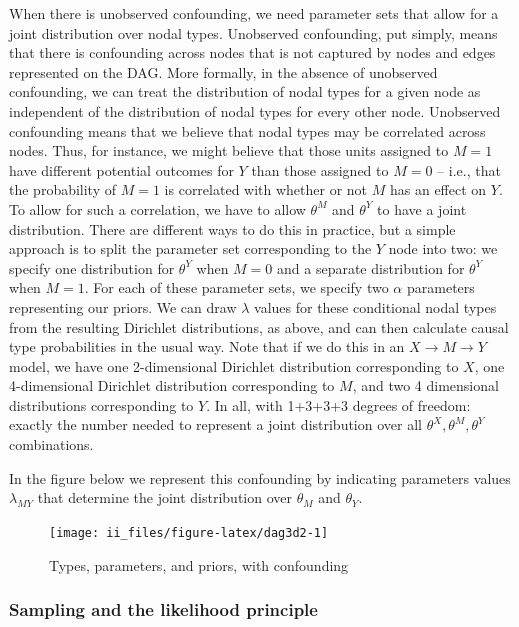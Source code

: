 \documentclass[
  12pt,
]{book}
\begin{document}
When there is unobserved confounding, we need parameter sets that allow for a joint distribution over nodal types. Unobserved confounding, put simply, means that there is confounding across nodes that is not captured by nodes and edges represented on the DAG. More formally, in the absence of unobserved confounding, we can treat the distribution of nodal types for a given node as independent of the distribution of nodal types for every other node. Unobserved confounding means that we believe that nodal types may be correlated across nodes. Thus, for instance, we might believe that those units assigned to \(M=1\) have different potential outcomes for \(Y\) than those assigned to \(M=0\) -- i.e., that the probability of \(M=1\) is correlated with whether or not \(M\) has an effect on \(Y\). To allow for such a correlation, we have to allow \(\theta^M\) and \(\theta^Y\) to have a joint distribution. There are different ways to do this in practice, but a simple approach is to split the parameter set corresponding to the \(Y\) node into two: we specify one distribution for \(\theta^Y\) when \(M=0\) and a separate distribution for \(\theta^Y\) when \(M=1\). For each of these parameter sets, we specify two \(\alpha\) parameters representing our priors. We can draw \(\lambda\) values for these conditional nodal types from the resulting Dirichlet distributions, as above, and can then calculate causal type probabilities in the usual way. Note that if we do this in an \(X \rightarrow M \rightarrow Y\) model, we have one 2-dimensional Dirichlet distribution corresponding to \(X\), one 4-dimensional Dirichlet distribution corresponding to \(M\), and two 4 dimensional distributions corresponding to \(Y\). In all, with 1+3+3+3 degrees of freedom: exactly the number needed to represent a joint distribution over all \(\theta^X, \theta^M, \theta^Y\) combinations.

In the figure below we represent this confounding by indicating parameters values \(\lambda_{MY}\) that determine the joint distribution over \(\theta_M\) and \(\theta_Y\).

\begin{figure}

{\centering \texttt{[image: ii\_files/figure-latex/dag3d2-1]} 

}

\caption{Types, parameters, and priors, with confounding}\label{fig:dag3d2}
\end{figure}

\hypertarget{sampling-and-the-likelihood-principle}{%
\subsubsection{Sampling and the likelihood principle}\label{sampling-and-the-likelihood-principle}}
\end{document}
